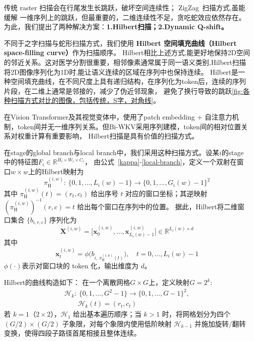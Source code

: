 \documentclass[conference]{IEEEtran}   %
\begin{document}
传统 raster 扫描会在行尾发生长跳跃，破坏空间连续性；
ZigZag~\cite{zigrir}扫描方式,虽能缓解 一维序列上的跳跃，但最重要的，二维连续性不足，贪吃蛇效应依然存在。
为此，我们提出了两种解决方案：\textbf{1.Hilbert扫描；2.Dynamic Q-shift。}


不同于之字扫描与蛇形扫描方式，我们使用 \textbf{Hilbert\cite{hilbert} 空间填充曲线（Hilbert space-filling curve）}作为扫描顺序。
Hilbert相比上述方式,能更好地保持2D空间的邻近关系。这对医学分割很重要，相邻像素通常属于同一语义类别,Hilbert扫描将2D图像序列化为1D时,能让语义连续的区域在序列中也保持连续。
Hilbert是一种空间填充曲线，在不同尺度上具有递归结构，在序列化为token后，连续的序列片段，在二维上通常是邻接的，减少了伪近邻现象，
避免了换行导致的跳跃\ref{fig:各种扫描方式对比的图像，包括传统，S字，对角线}。


在Vision Transformer及其视觉变体中，使用了patch embedding + 自注意力机制，token间并无一维序列关系。但Bi-WKV采用序列建模，token间的相对位置关系对权重计算有重要影响，
Hilbert扫描是具有价值的扫描方式。

在stage的global branch与local branch中，我们采用这种扫描方式。设某$i$的stage中的特征图$F_i\in\mathbb{R}^{H_i\times W_i\times C_i}$，
由公式~\ref{kappa}-\ref{local-branch}，定义一个双射在窗口$w\times w$上的Hilbert映射为
\begin{equation}\label{eq:paper-auto-06}
    \pi^{(i,w)}_{\mathrm{H}}:\ \{0,1,\dots,L_i(w)-1\}\to \{0,1,\dots,G_i(w)-1\}^2
\end{equation}
其中 $\pi^{(i,w)}_{\mathrm{H}}(t)=(r_t,c_t)$ 给出序号 $t$ 对应的窗口坐标；其逆映射 $(\pi^{(i,w)}_{\mathrm{H}})^{-1}(r,c)=t$ 给出每个窗口在序列中的位置。
据此，Hilbert将二维窗口集合 $\{b_{i,r,c}\}$ 序列化为
\begin{equation}\label{eq:paper-auto-07}
    \mathbf{X}^{(i,w)}=\big[\mathbf{x}^{(i,w)}_{0},\dots,\mathbf{x}^{(i,w)}_{L_i(w)-1}\big]\in\mathbb{R}^{L_i(w)\times d}
\end{equation}
其中
\begin{equation}\label{eq:paper-auto-08}
    \mathbf{x}^{(i,w)}_{t} = \phi\big(b_{i,\ \pi^{(i,w)}_{\mathrm{H}}(t)}\big),\quad t=0,\dots,L_i(w)-1
\end{equation}
$\phi(\cdot)$表示对窗口块的 token 化，输出维度为 $d$。

Hilbert的曲线构造如下：
在一个离散网格$G\times G$上，定义映射$G=2^k$:
\begin{equation}\label{eq:paper-auto-09}
    \begin{aligned}
        \mathcal{H}_k:\ \{0,1,\dots,G^2-1\}\to \{0,1,\dots,G-1\}^2,\\\qquad \mathcal{H}_k(t)=(r_t,c_t)
    \end{aligned}
\end{equation}
若 $k=1$（$2\times2$），$\mathcal{H}_1$ 给出基本遍历顺序；当 $k>1$ 时，将网格划分为四个 $(G/2)\times(G/2)$ 子象限，对每个象限内使用低阶映射 $\mathcal{H}_{k-1}$ 并施加旋转/翻转变换，使得四段子路径首尾相接且整体连续。
\end{document}

